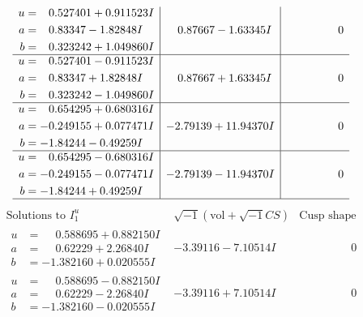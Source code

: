 \documentclass[1p]{elsarticle_modified}
\theoremstyle{definition}
\newcommand{\I}{\sqrt{-1}}
\begin{document}
$$\begin{array}{c|c|c}
\begin{aligned}
u &= \phantom{-}0.527401 + 0.911523 I \\
a &= \phantom{-}0.83347 - 1.82848 I \\
b &= \phantom{-}0.323242 + 1.049860 I\end{aligned}
 & \phantom{-}0.87667 - 1.63345 I & \phantom{-0.000000 } 0 \\ \hline\begin{aligned}
u &= \phantom{-}0.527401 - 0.911523 I \\
a &= \phantom{-}0.83347 + 1.82848 I \\
b &= \phantom{-}0.323242 - 1.049860 I\end{aligned}
 & \phantom{-}0.87667 + 1.63345 I & \phantom{-0.000000 } 0 \\ \hline\begin{aligned}
u &= \phantom{-}0.654295 + 0.680316 I \\
a &= -0.249155 + 0.077471 I \\
b &= -1.84244 - 0.49259 I\end{aligned}
 & -2.79139 + 11.94370 I & \phantom{-0.000000 } 0 \\ \hline\begin{aligned}
u &= \phantom{-}0.654295 - 0.680316 I \\
a &= -0.249155 - 0.077471 I \\
b &= -1.84244 + 0.49259 I\end{aligned}
 & -2.79139 - 11.94370 I & \phantom{-0.000000 } 0\\
 \hline 
 \end{array}$$\newpage$$\begin{array}{c|c|c}  
\text{Solutions to }I^u_{1}& \I (\text{vol} + \sqrt{-1}CS) & \text{Cusp shape}\\
 \hline 
\begin{aligned}
u &= \phantom{-}0.588695 + 0.882150 I \\
a &= \phantom{-}0.62229 + 2.26840 I \\
b &= -1.382160 + 0.020555 I\end{aligned}
 & -3.39116 - 7.10514 I & \phantom{-0.000000 } 0 \\ \hline\begin{aligned}
u &= \phantom{-}0.588695 - 0.882150 I \\
a &= \phantom{-}0.62229 - 2.26840 I \\
b &= -1.382160 - 0.020555 I\end{aligned}
 & -3.39116 + 7.10514 I & \phantom{-0.000000 } 0 \\ \hline\begin{aligned}

\end{aligned}
\end{array}$$
\end{document}
